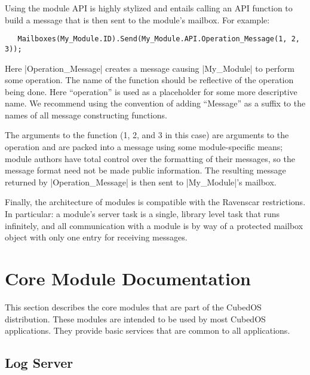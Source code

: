 Using the module API is highly stylized and entails calling an API function to build a message
that is then sent to the module's mailbox. For example:

\begin{lstlisting}
   Mailboxes(My_Module.ID).Send(My_Module.API.Operation_Message(1, 2, 3));
\end{lstlisting}

Here |Operation_Message| creates a message causing |My_Module| to perform some operation. The
name of the function should be reflective of the operation being done. Here ``operation'' is
used as a placeholder for some more descriptive name. We recommend using the convention of
adding ``Message'' as a suffix to the names of all message constructing functions.

The arguments to the function (1, 2, and 3 in this case) are arguments to the operation and are
packed into a message using some module-specific means; module authors have total control over
the formatting of their messages, so the message format need not be made public information.
 The resulting
message returned by |Operation_Message| is then sent to |My_Module|'s mailbox.

Finally, the architecture of modules is compatible with the Ravenscar restrictions. In
particular: a module's server task is a single, library level task that runs infinitely, and all
communication with a module is by way of a protected mailbox object with only one entry for
receiving messages.

\section{Core Module Documentation}
\label{sec:core-module-documentation}

This section describes the core modules that are part of the CubedOS distribution. These modules
are intended to be used by most CubedOS applications. They provide basic services that are
common to all applications.

\subsection{Log Server}
\label{sec:log-server}


